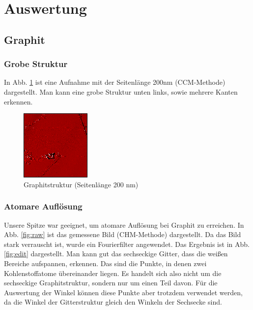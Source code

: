 \newpage

\section{Auswertung}
\subsection{Graphit}
\subsubsection{Grobe Struktur}

In Abb. \ref{fig:raw_big} ist eine Aufnahme mit der Seitenlänge 200nm (CCM-Methode) dargestellt. Man kann eine grobe Struktur unten links, sowie mehrere Kanten erkennen.

\begin{figure}[h]
    \centering
    \includegraphics{data/graphit/raw_big.png}
    \caption{Graphitstruktur (Seitenlänge 200 nm)}
    \label{fig:raw_big}
\end{figure}

\subsubsection{Atomare Auflösung}
Unsere Spitze war geeignet, um atomare Auflösung bei Graphit zu erreichen. In Abb. \ref{fig:raw} ist das gemessene Bild (CHM-Methode) dargestellt. Da das Bild stark verrauscht ist, wurde ein Fourierfilter angewendet. Das Ergebnis ist in Abb. \ref{fig:edit} dargestellt. Man kann gut das sechseckige Gitter, dass die weißen Bereiche aufspannen, erkennen. Das sind die Punkte, in denen zwei Kohlenstoffatome übereinander liegen. Es handelt sich also nicht um die sechseckige Graphitstruktur, sondern nur um einen Teil davon. Für die Auswertung der Winkel können diese Punkte aber trotzdem verwendet werden, da die Winkel der Gitterstruktur gleich den Winkeln der Sechsecke sind.\\

